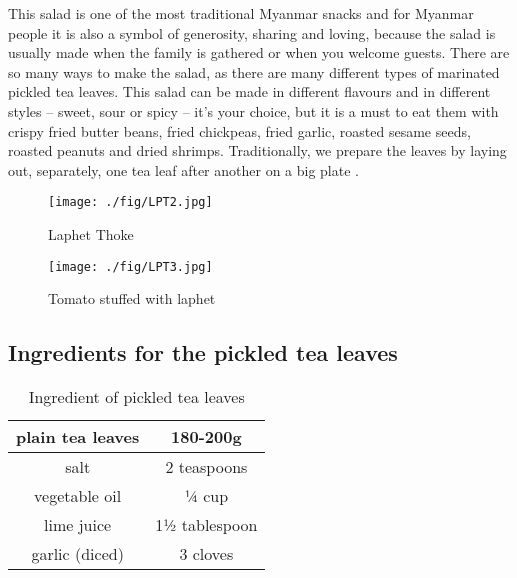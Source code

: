 \documentclass[conference]{IEEEtran}
\begin{document}
This salad is one of the most traditional Myanmar snacks and for Myanmar people it is also a symbol of generosity, sharing and loving, because the salad is usually made when the family is gathered or when you welcome guests. There are so many ways to make the salad, as there are many different types of marinated pickled tea leaves. This salad can be made in different flavours and in different styles – sweet, sour or spicy – it’s your choice, but it is a must to eat them with crispy fried butter beans, fried chickpeas, fried garlic, roasted sesame seeds, roasted peanuts and dried shrimps. Traditionally, we prepare the leaves by laying out, separately, one tea leaf after another on a big plate \cite{b8}.

\begin{figure}[ht!]
  \centering
\texttt{[image: ./fig/LPT2.jpg]}
  \caption{Laphet Thoke}
\label{fig:LPTFig1}
\end{figure}

\begin{figure}[ht!]
  \centering
\texttt{[image: ./fig/LPT3.jpg]}
  \caption{Tomato stuffed with laphet}
\label{fig:LPTFig2}
\end{figure}

\subsection{Ingredients for the pickled tea leaves}
\label{subsec:TLIngredient}
\begin{table}[h!]
\caption{\label{table:LPIng} Ingredient of pickled tea leaves}
\begin{center}
 \begin{tabular}{||c c||} 
 \hline
 plain tea leaves & 180-200g  \\ [0.5ex] 
 \hline
 \hline
 salt & 2 teaspoons  \\ [0.5ex] 
 \hline
\hline
 vegetable oil & ¼ cup  \\ [0.5ex] 
 \hline
\hline
 lime juice & 1½ tablespoon   \\ [0.5ex] 
 \hline
\hline
 garlic (diced) & 3 cloves  \\ [0.5ex] 
 \hline
\end{tabular}
\end{center}
\end{table}
\end{document}
